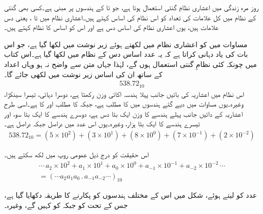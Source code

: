 

روز مرہ  زندگی میں اعشاری نظامِ گنتی  استعمال ہوتا ہے،  جو   تا   کے ہندسوں پر مبنی ہے۔کسی بھی گنتی کے نظام میں کل علامات کی تعداد کو اس نظام کی  اساس  کہتے ہیں۔اعشاری نظام   میں  تا ،  یعنی دس  علامات ہیں، یوں اعشاری نظام کی  اساس دس ہے اور اس  کو اساس   کا نظام کہتے ہیں۔

	مساوات   میں    کو  اعشاری نظام میں لکھتے ہوئے زیر نوشت  میں    لکھا گیا ہے، جو  اس بات کی یاد دہانی کراتا ہے کہ یہ عدد  اساس دس کے نظام میں لکھا گیا ہے۔اس کتاب میں چونکہ کئی نظامِ گنتی استعمال ہوں گے،  لہٰذا جہاں متن سے واضح نہ ہو وہاں اعداد کے ساتھ ان کی  اساس زیر نوشت میں لکھی  جائے گا۔
\begin{align}\label{مساوات_ثنائی_عدد}
538.72_{10}
\end{align}
اس نظام میں اعشاریہ کی بائیں جانب پہلا ہندسہ اکائی وزن رکھتا ہے، دوسرا دہائی، تیسرا سینکڑا،  وغیرہ۔یوں مساوات    میں  دیے گئے ہندسوں میں     کا 
مطلب     ہے،  جبکہ       کا مطلب      اور     کا      ہے۔اسی طرح اعشاریہ کے دائیں جانب پہلے  ہندسے   کا وزن ایک بٹا دس ہے، دوسرے  ہندسے  کا ایک بٹا سو،  اور تیسرے ہندسے کا ایک بٹا ہزار،  وغیرہ۔یوں  اس عدد میں    دراصل    جبکہ    دراصل    ہے۔
\begin{align}\label{مساوات_ثنائی_سینکڑا}
538.72_{10}=(5\times 10^2)+(3\times 10^1)+(8\times 10^0)+(7\times 10^{-1})+(2\times 10^{-2})
\end{align}

اس حقیقت  کو درج ذیل  عمومی روپ  میں   لکھ سکتے ہیں۔
\begin{multline}\label{مساوات_ثنائی_عمومی_روپ}
\cdots \,a_2\times 10^2+a_1\times 10^1+a_0\times 10^0+a_{-1}\times 10^{-1}+a_{-2}\times 10^{-2}\, \cdots\\
=(\cdots a_2a_1a_0\, .\, a_{-1}a_{-2}\cdots)_{10}
\end{multline}

 عدد   کو    لیتے   ہوئے، شکل     میں اس  کے مختلف ہندسوں کو پکارنے  کا طریقہ دکھایا گیا ہے،   جس کے تحت   کو   جبکہ    کو  کہیں گے، وغیرہ۔

